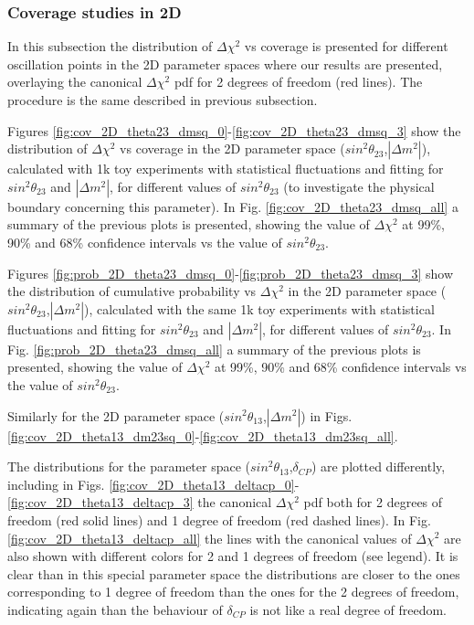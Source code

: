 \subsubsection{Coverage studies in 2D}
\label{app:cov:statonly:2d}
In this subsection the distribution of $\Delta\chi^{2}$ vs coverage is presented
for different oscillation points in the 2D parameter spaces where our results are presented,
overlaying the canonical $\Delta\chi^{2}$ pdf for 2 degrees of freedom (red lines). 
The procedure is the same described in previous subsection. 

Figures \ref{fig:cov_2D_theta23_dmsq_0}-\ref{fig:cov_2D_theta23_dmsq_3} show the distribution of $\Delta\chi^{2}$ vs coverage
in the 2D parameter space ($sin^{2}\theta_{23}$,$|\Delta m^{2}|$), calculated with 1k toy experiments with statistical fluctuations 
and fitting for $sin^{2}\theta_{23}$ and $|\Delta m^{2}|$, for different values of $sin^{2}\theta_{23}$ (to investigate the physical boundary concerning this parameter). 
In Fig. \ref{fig:cov_2D_theta23_dmsq_all} a summary of the previous plots is presented,
showing the value of $\Delta\chi^{2}$ at 99\%, 90\% and 68\% confidence intervals vs the value of $sin^{2}\theta_{23}$.

Figures \ref{fig:prob_2D_theta23_dmsq_0}-\ref{fig:prob_2D_theta23_dmsq_3} show the distribution of cumulative probability vs $\Delta\chi^{2}$
in the 2D parameter space ($sin^{2}\theta_{23}$,$|\Delta m^{2}|$), calculated with the same 1k toy experiments with statistical fluctuations 
and fitting for $sin^{2}\theta_{23}$ and $|\Delta m^{2}|$, for different values of $sin^{2}\theta_{23}$.
In Fig. \ref{fig:prob_2D_theta23_dmsq_all} a summary of the previous plots is presented,
showing the value of $\Delta\chi^{2}$ at 99\%, 90\% and 68\% confidence intervals vs the value of $sin^{2}\theta_{23}$.

Similarly for the 2D parameter space ($sin^{2}\theta_{13}$,$|\Delta m^{2}|$) in Figs. \ref{fig:cov_2D_theta13_dm23sq_0}-\ref{fig:cov_2D_theta13_dm23sq_all}.

The distributions for the parameter space ($sin^{2}\theta_{13}$,$\delta_{CP}$) are plotted differently,
including in Figs. \ref{fig:cov_2D_theta13_deltacp_0}-\ref{fig:cov_2D_theta13_deltacp_3} the canonical
$\Delta\chi^{2}$ pdf both for 2 degrees of freedom (red solid lines) and 1 degree of freedom (red dashed lines). 
In Fig. \ref{fig:cov_2D_theta13_deltacp_all} the lines with the canonical values of $\Delta\chi^{2}$ are also 
shown with different colors for 2 and 1 degrees of freedom (see legend). 
It is clear than in this special parameter space the distributions are closer to the ones corresponding to 1 degree
of freedom than the ones for the 2 degrees of freedom, indicating again than the behaviour of $\delta_{CP}$ is not like a real degree of freedom.

